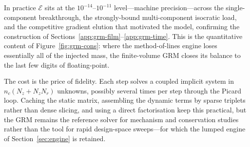 In practice $\mathcal{E}$ sits at the $10^{-14}$--$10^{-11}$ level---machine
precision---across the single-component breakthrough, the strongly-bound
multi-component isocratic load, and the competitive gradient elution that
motivated the model, confirming the construction of
Sections~\ref{app:grm-film}--\ref{app:grm-time}. This is the quantitative content
of Figure~\ref{fig:grm-cons}: where the method-of-lines engine loses essentially
all of the injected mass, the finite-volume GRM closes its balance to the last
few digits of floating-point.

\begin{remark}
The cost is the price of fidelity. Each step solves a coupled implicit system in
$n_c(N_z + N_z N_r)$ unknowns, possibly several times per step through the Picard
loop. Caching the static matrix, assembling the dynamic terms by sparse triplets
rather than dense slicing, and using a direct factorisation keep this practical,
but the GRM remains the reference solver for mechanism and conservation studies
rather than the tool for rapid design-space sweeps---for which the lumped engine
of Section~\ref{sec:engine} is retained.
\end{remark}
